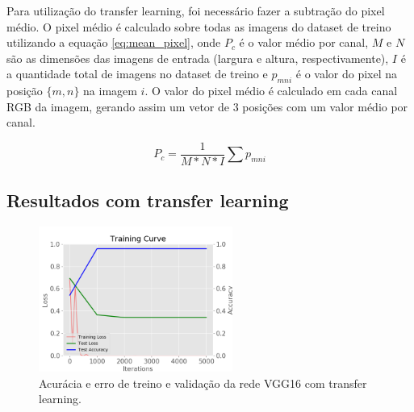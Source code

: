 \documentclass[conference]{IEEEtran}
\begin{document}

  
  
  Para utilização do transfer learning, foi necessário fazer a subtração do pixel médio. O pixel médio é calculado sobre todas as imagens do dataset de treino utilizando a equação \ref{eq:mean_pixel}, onde $P_c$ é o valor médio por canal, $M$ e $N$ são as dimensões das imagens de entrada (largura e altura, respectivamente), $I$ é a quantidade total de imagens no dataset de treino e $p_{mni}$ é o valor do pixel na posição $\{m,n\}$ na imagem $i$. O valor do pixel médio é calculado em cada canal RGB da imagem, gerando assim um vetor de 3 posições com um valor médio por canal.


  \begin{equation}
    P_c = \frac{1}{M * N * I} \sum p_{mni}
    \label{eq:mean_pixel}
  \end{equation}



  \subsection{Resultados com transfer learning}


  \begin{figure}[!tp]
    \centering
    \includegraphics[width=2.5in]{img/curve_vgg16.png}
    \caption{Acurácia e erro de treino e validação da rede VGG16 com transfer learning.}
    \label{fig:acuracia_vgg16_transfer}
  \end{figure}
\end{document}
